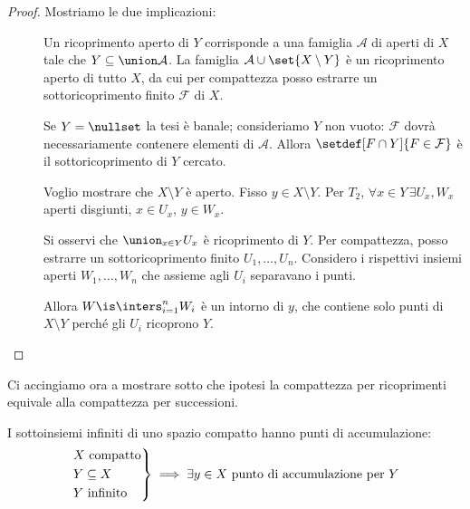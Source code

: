 \begin{proof}
Mostriamo le due implicazioni:
\begin{description}
	\item[\proofleftarrow]
		Un ricoprimento aperto di $Y$ corrisponde a una famiglia  $\mathcal A$ di aperti di $X$ tale che $Y\subseteq \union\mathcal A$.
  La famiglia $\mathcal A \cup \set{X\setminus Y}$ è un ricoprimento aperto di tutto $X$,
		da cui per compattezza posso estrarre un sottoricoprimento finito $\mathcal F$ di $X$.
  
  Se $Y=\nullset$ la tesi è banale; consideriamo $Y$ non vuoto:
  $\mathcal F$ dovrà necessariamente contenere elementi di $\mathcal A$.
  Allora $\setdef[F\cap Y]{F\in\mathcal F}$ è il sottoricoprimento di $Y$ cercato.\footnotemark
 \item[\proofrightarrow]
		Voglio mostrare che $X\setminus Y$ è aperto.
		Fisso $y\in X\setminus Y$.
  Per $T_2$, $\forall x\in Y\, \exists U_x, W_x$ aperti disgiunti, $x\in U_x$, $y\in W_x$.
		
		Si osservi che $\union_{x\in Y}U_x$ è ricoprimento di $Y$. Per compattezza, posso estrarre un sottoricoprimento finito $U_1,\dots, U_n$.
		Considero i rispettivi insiemi aperti $W_1,\dots, W_n$ che assieme agli $U_i$ separavano i punti.
  
		Allora $W\is \inters_{i=1}^nW_i$ è un intorno di $y$,
  che contiene solo punti di $X\setminus Y$ perché gli $U_i$ ricoprono $Y$.
  \qedhere
	\end{description}
\end{proof}


Ci accingiamo ora a mostrare sotto che ipotesi la compattezza per ricoprimenti equivale alla compattezza per successioni.

\begin{lemma}
 \label{th:infcompacc}
 I sottoinsiemi infiniti di uno spazio compatto hanno punti di accumulazione:
 \[\begin{rcases}
  \text{$X$ compatto} \\
  Y\subseteq X \\
  \text{$Y$ infinito}
 \end{rcases}\implies
 \exists y\in X\text{ punto di accumulazione per }Y\]
\end{lemma}

